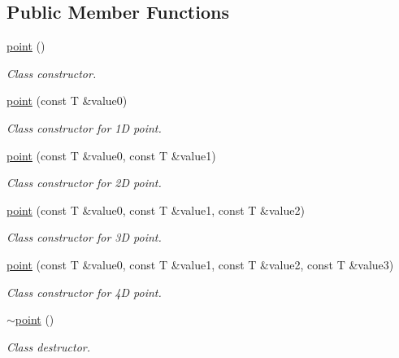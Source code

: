 \subsection*{Public Member Functions}
\begin{DoxyCompactItemize}
\item 
\mbox{\label{classacme_1_1point_acc181334f965fae46559815f996ae50c}} 
\hyperlink{classacme_1_1point_acc181334f965fae46559815f996ae50c}{point} ()
\begin{DoxyCompactList}\small\item\em Class constructor. \end{DoxyCompactList}\item 
\hyperlink{classacme_1_1point_ae1877073e915c45fba6ad5bbefc37f11}{point} (const T \&value0)
\begin{DoxyCompactList}\small\item\em Class constructor for 1D point. \end{DoxyCompactList}\item 
\hyperlink{classacme_1_1point_a83633e83dfae312248d0a01fc9291f2a}{point} (const T \&value0, const T \&value1)
\begin{DoxyCompactList}\small\item\em Class constructor for 2D point. \end{DoxyCompactList}\item 
\hyperlink{classacme_1_1point_a45d14bd173cd20cabc9a560ca5c443a3}{point} (const T \&value0, const T \&value1, const T \&value2)
\begin{DoxyCompactList}\small\item\em Class constructor for 3D point. \end{DoxyCompactList}\item 
\hyperlink{classacme_1_1point_a786ca3e2c1b683a55469a79a7a68f2a9}{point} (const T \&value0, const T \&value1, const T \&value2, const T \&value3)
\begin{DoxyCompactList}\small\item\em Class constructor for 4D point. \end{DoxyCompactList}\item 
\mbox{\label{classacme_1_1point_a9d5898e4477a7ee90e199988c50c9ad4}} 
\hyperlink{classacme_1_1point_a9d5898e4477a7ee90e199988c50c9ad4}{$\sim$point} ()
\begin{DoxyCompactList}\small\item\em Class destructor. \end{DoxyCompactList}\item 

\end{DoxyCompactItemize}
